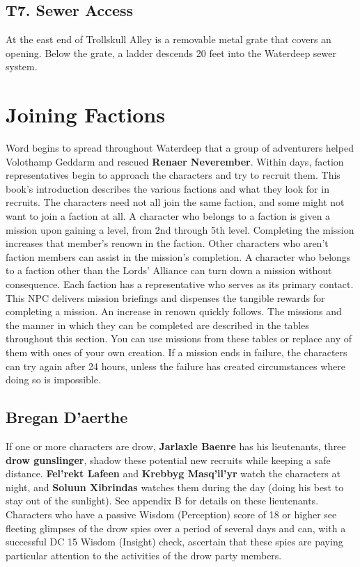\documentclass[10pt,a4paper,twoside,twocolumn,openany,nodeprecatedcode]{dndbook}
\begin{document}
\subsection{T7. Sewer Access}
At the east end of Trollskull Alley is a removable metal grate that covers an opening. Below the grate, a ladder descends 20 feet into the Waterdeep sewer system.
\section{Joining Factions}
Word begins to spread throughout Waterdeep that a group of adventurers helped Volothamp Geddarm and rescued \textbf{Renaer Neverember}. Within days, faction representatives begin to approach the characters and try to recruit them. This book's introduction describes the various factions and what they look for in recruits. The characters need not all join the same faction, and some might not want to join a faction at all.
A character who belongs to a faction is given a mission upon gaining a level, from 2nd through 5th level. Completing the mission increases that member's renown in the faction. Other characters who aren't faction members can assist in the mission's completion. A character who belongs to a faction other than the Lords' Alliance can turn down a mission without consequence.
Each faction has a representative who serves as its primary contact. This NPC delivers mission briefings and dispenses the tangible rewards for completing a mission. An increase in renown quickly follows. The missions and the manner in which they can be completed are described in the tables throughout this section. You can use missions from these tables or replace any of them with ones of your own creation.
If a mission ends in failure, the characters can try again after 24 hours, unless the failure has created circumstances where doing so is impossible.
\subsection{Bregan D'aerthe}
If one or more characters are drow, \textbf{Jarlaxle Baenre} has his lieutenants, three \textbf{drow gunslinger}, shadow these potential new recruits while keeping a safe distance. \textbf{Fel'rekt Lafeen} and \textbf{Krebbyg Masq'il'yr} watch the characters at night, and \textbf{Soluun Xibrindas} watches them during the day (doing his best to stay out of the sunlight). See appendix B for details on these lieutenants.
Characters who have a passive Wisdom (Perception) score of 18 or higher see fleeting glimpses of the drow spies over a period of several days and can, with a successful DC 15 Wisdom (Insight) check, ascertain that these spies are paying particular attention to the activities of the drow party members.
\end{document}
